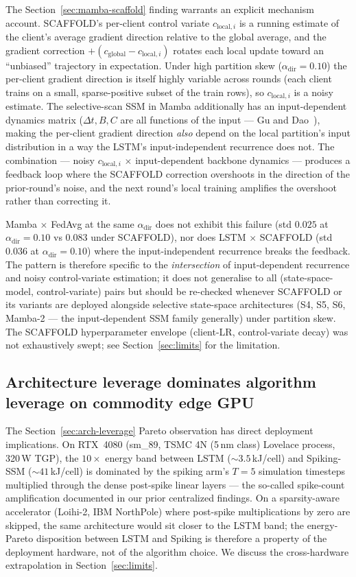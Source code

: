 \documentclass[journal]{IEEEtran}
\newcommand{\alphadir}{\ensuremath{\alpha_{\mathrm{dir}}}}
\begin{document}
The Section~\ref{sec:mamba-scaffold} finding warrants an explicit mechanism account. SCAFFOLD's per-client control variate $c_{\mathrm{local},i}$ is a running estimate of the client's average gradient direction relative to the global average, and the gradient correction $+(c_{\mathrm{global}} - c_{\mathrm{local},i})$ rotates each local update toward an ``unbiased'' trajectory in expectation. Under high partition skew ($\alphadir = 0.10$) the per-client gradient direction is itself highly variable across rounds (each client trains on a small, sparse-positive subset of the train rows), so $c_{\mathrm{local},i}$ is a noisy estimate. The selective-scan SSM in Mamba additionally has an input-dependent dynamics matrix ($\Delta t, B, C$ are all functions of the input --- Gu and Dao~\cite{GuDao2023_Mamba}), making the per-client gradient direction \emph{also} depend on the local partition's input distribution in a way the LSTM's input-independent recurrence does not. The combination --- noisy $c_{\mathrm{local},i}$ $\times$ input-dependent backbone dynamics --- produces a feedback loop where the SCAFFOLD correction overshoots in the direction of the prior-round's noise, and the next round's local training amplifies the overshoot rather than correcting it.

Mamba $\times$ FedAvg at the same $\alphadir$ does not exhibit this failure (std $0.025$ at $\alphadir = 0.10$ vs $0.083$ under SCAFFOLD), nor does LSTM $\times$ SCAFFOLD (std $0.036$ at $\alphadir = 0.10$) where the input-independent recurrence breaks the feedback. The pattern is therefore specific to the \emph{intersection} of input-dependent recurrence and noisy control-variate estimation; it does not generalise to all (state-space-model, control-variate) pairs but should be re-checked whenever SCAFFOLD or its variants are deployed alongside selective state-space architectures (S4, S5, S6, Mamba-2 --- the input-dependent SSM family generally) under partition skew. The SCAFFOLD hyperparameter envelope (client-LR, control-variate decay) was not exhaustively swept; see Section~\ref{sec:limits} for the limitation.

\subsection{Architecture leverage dominates algorithm leverage on commodity edge GPU}\label{sec:arch-leverage-discussion}

The Section~\ref{sec:arch-leverage} Pareto observation has direct deployment implications. On RTX~4080 (sm\_89, TSMC 4N (5\,nm class) Lovelace process, 320\,W TGP), the $10\times$ energy band between LSTM ($\sim 3.5$\,kJ/cell) and Spiking-SSM ($\sim 41$\,kJ/cell) is dominated by the spiking arm's $T = 5$ simulation timesteps multiplied through the dense post-spike linear layers --- the so-called spike-count amplification documented in our prior centralized findings. On a sparsity-aware accelerator (Loihi-2, IBM NorthPole) where post-spike multiplications by zero are skipped, the same architecture would sit closer to the LSTM band; the energy-Pareto disposition between LSTM and Spiking is therefore a property of the deployment hardware, not of the algorithm choice. We discuss the cross-hardware extrapolation in Section~\ref{sec:limits}.
\end{document}
